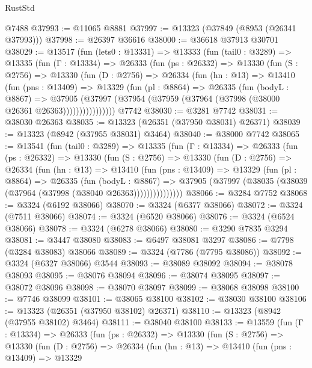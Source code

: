 \begin{lexlean}{RustStd}
\begin{coremodule}
    @7488
@37993 := @11065 @8881
@37997 := @13323 (@37849 (@8953 (@26341 @37993)))
@37998 := @26397 @36616
@38000 := @36618 @37913 @30701
@38029 := @13517
    (fun (lets0 : @13331) =>
    @13333
      (fun (tail0 : @3289) =>
      @13335
        (fun (Γ : @13334) =>
        @26333
          (fun (ps : @26332) =>
          @13330
            (fun (S : @2756) =>
            @13330
              (fun (D : @2756) =>
              @26334
                (fun (hn : @13) =>
                @13410
                  (fun (pns : @13409) =>
                  @13329
                    (fun (pl : @8864) =>
                    @26335
                      (fun (bodyL : @8867) =>
                      @37905
                        (@37997
                          (@37954 (@37959 (@37964 (@37998 (@38000 @26361 @26363))))))))))))))))
    @7742
@38030 := @3281 @7742
@38031 := @38030 @26363
@38035 := @13323 (@26351 (@37950 @38031) @26371)
@38039 := @13323 (@8942 (@37955 @38031) @3464)
@38040 := @38000 @7742
@38065 := @13541
    (fun (tail0 : @3289) =>
    @13335
      (fun (Γ : @13334) =>
      @26333
        (fun (ps : @26332) =>
        @13330
          (fun (S : @2756) =>
          @13330
            (fun (D : @2756) =>
            @26334
              (fun (hn : @13) =>
              @13410
                (fun (pns : @13409) =>
                @13329
                  (fun (pl : @8864) =>
                  @26335
                    (fun (bodyL : @8867) =>
                    @37905 (@37997 (@38035 (@38039 (@37964 (@37998 (@38040 @26363)))))))))))))))
@38066 := @3284 @7752
@38068 := @3324 (@6192 @38066)
@38070 := @3324 (@6377 @38066)
@38072 := @3324 (@7511 @38066)
@38074 := @3324 (@6520 @38066)
@38076 := @3324 (@6524 @38066)
@38078 := @3324 (@6278 @38066)
@38080 := @3290 @7835 @3294
@38081 := @3447 @38080
@38083 := @6497 @38081 @3297
@38086 := @7798 (@3284 @38083) @38066
@38089 := @3324 (@7786 (@7795 @38086))
@38092 := @3324 (@6327 @38066) @3544
@38093 := @38089 @38092
@38094 := @38078 @38093
@38095 := @38076 @38094
@38096 := @38074 @38095
@38097 := @38072 @38096
@38098 := @38070 @38097
@38099 := @38068 @38098
@38100 := @7746 @38099
@38101 := @38065 @38100
@38102 := @38030 @38100
@38106 := @13323 (@26351 (@37950 @38102) @26371)
@38110 := @13323 (@8942 (@37955 @38102) @3464)
@38111 := @38040 @38100
@38133 := @13559
    (fun (Γ : @13334) =>
    @26333
      (fun (ps : @26332) =>
      @13330
        (fun (S : @2756) =>
        @13330
          (fun (D : @2756) =>
          @26334
            (fun (hn : @13) =>
            @13410
              (fun (pns : @13409) =>
              @13329

\end{coremodule}
\end{lexlean}
